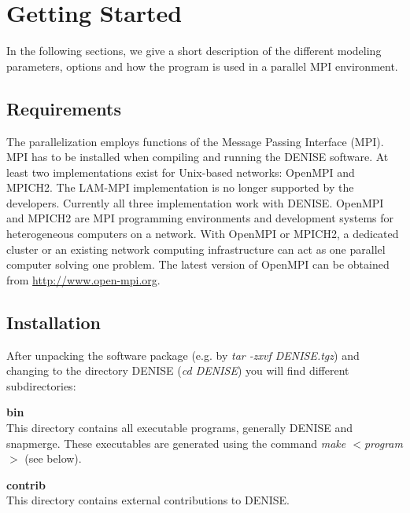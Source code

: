 
\chapter{\label{cha:Getting-Started}Getting Started}


In the following sections, we give a short description of the different modeling  parameters, options and how the program is used in a parallel MPI environment.

\section{Requirements}
The parallelization employs functions of the Message Passing Interface (MPI). MPI has to be installed when compiling and running the DENISE software. At least two implementations exist for Unix-based networks: OpenMPI and MPICH2. The LAM-MPI implementation is no longer supported by the developers. Currently all three implementation work with DENISE. OpenMPI and MPICH2 are MPI programming environments and development systems for heterogeneous computers on a network. With OpenMPI or MPICH2, a dedicated cluster or an existing network computing  infrastructure can act as one parallel computer solving one problem. The latest version of OpenMPI can be obtained from \href{http://www.open-mpi.org}{http://www.open-mpi.org}.%


\section{Installation}
\label{installation}
After unpacking the software package (e.g. by \textit{tar -zxvf DENISE.tgz}) and changing to the directory DENISE (\textit{cd DENISE})  you will find different subdirectories:

\textbf{bin}\\
This directory contains all executable programs, generally DENISE and snapmerge. These executables are generated using the command \textit{make $<$program$>$} (see below).

\textbf{contrib}\\
This directory contains external contributions to DENISE.

